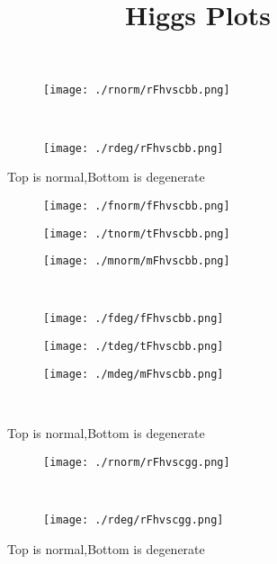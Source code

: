 \documentclass[aps,floats,floatfix,nofootinbib]{revtex4-1}
\begin{document}
\title{Higgs Plots}

\maketitle


\begin{center}
\begin{figure}
\begin{subfigure}{0.95\textwidth}
\texttt{[image: ./rnorm/rFhvscbb.png]}
\label{}
\end{subfigure}\\
\begin{subfigure}{0.95\textwidth}
\texttt{[image: ./rdeg/rFhvscbb.png]}
\label{}
\end{subfigure}
\caption{Top is normal,Bottom is degenerate}
\end{figure}
\end{center}

\begin{center}
\begin{figure}
\begin{subfigure}{0.3\textwidth}
\texttt{[image: ./fnorm/fFhvscbb.png]}
\label{}
\end{subfigure}
\begin{subfigure}{0.3\textwidth}
\texttt{[image: ./tnorm/tFhvscbb.png]}
\label{}
\end{subfigure}
\begin{subfigure}{0.3\textwidth}
\texttt{[image: ./mnorm/mFhvscbb.png]}
\label{}
\end{subfigure}\\
\begin{subfigure}{0.3\textwidth}
\texttt{[image: ./fdeg/fFhvscbb.png]}
\label{}
\end{subfigure}
\begin{subfigure}{0.3\textwidth}
\texttt{[image: ./tdeg/tFhvscbb.png]}
\label{}
\end{subfigure}
\begin{subfigure}{0.3\textwidth}
\texttt{[image: ./mdeg/mFhvscbb.png]}
\label{}
\end{subfigure}\\
\caption{Top is normal,Bottom is degenerate}
\end{figure}
\end{center}

\begin{center}
\begin{figure}
\begin{subfigure}{0.95\textwidth}
\texttt{[image: ./rnorm/rFhvscgg.png]}
\label{}
\end{subfigure}\\
\begin{subfigure}{0.95\textwidth}
\texttt{[image: ./rdeg/rFhvscgg.png]}
\label{}
\end{subfigure}
\caption{Top is normal,Bottom is degenerate}
\end{figure}
\end{center}
\end{document}
